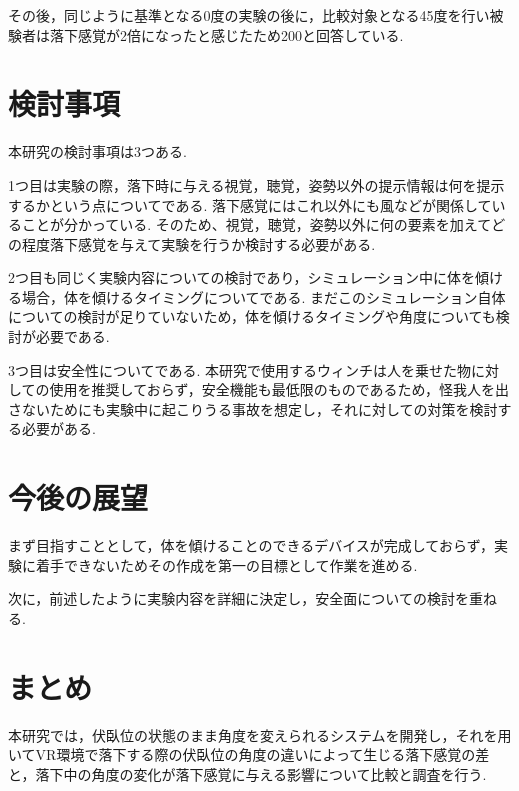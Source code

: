 \documentclass[uplatex]{jsarticle}
\begin{document}
その後，同じように基準となる0度の実験の後に，比較対象となる45度を行い被験者は落下感覚が2倍になったと感じたため200と回答している.

\section{検討事項}
本研究の検討事項は3つある.

1つ目は実験の際，落下時に与える視覚，聴覚，姿勢以外の提示情報は何を提示するかという点についてである.
落下感覚にはこれ以外にも風などが関係していることが分かっている\cite{青木誠也2018音と風によって浮遊感を感じさせる装置の制作}.
そのため、視覚，聴覚，姿勢以外に何の要素を加えてどの程度落下感覚を与えて実験を行うか検討する必要がある.

2つ目も同じく実験内容についての検討であり，シミュレーション中に体を傾ける場合，体を傾けるタイミングについてである.
まだこのシミュレーション自体についての検討が足りていないため，体を傾けるタイミングや角度についても検討が必要である.

3つ目は安全性についてである.
本研究で使用するウィンチは人を乗せた物に対しての使用を推奨しておらず，安全機能も最低限のものであるため，怪我人を出さないためにも実験中に起こりうる事故を想定し，それに対しての対策を検討する必要がある.

\section{今後の展望}
まず目指すこととして，体を傾けることのできるデバイスが完成しておらず，実験に着手できないためその作成を第一の目標として作業を進める.

次に，前述したように実験内容を詳細に決定し，安全面についての検討を重ねる.

\section{まとめ}
本研究では，伏臥位の状態のまま角度を変えられるシステムを開発し，それを用いてVR環境で落下する際の伏臥位の角度の違いによって生じる落下感覚の差と，落下中の角度の変化が落下感覚に与える影響について比較と調査を行う.


 
\end{document}
